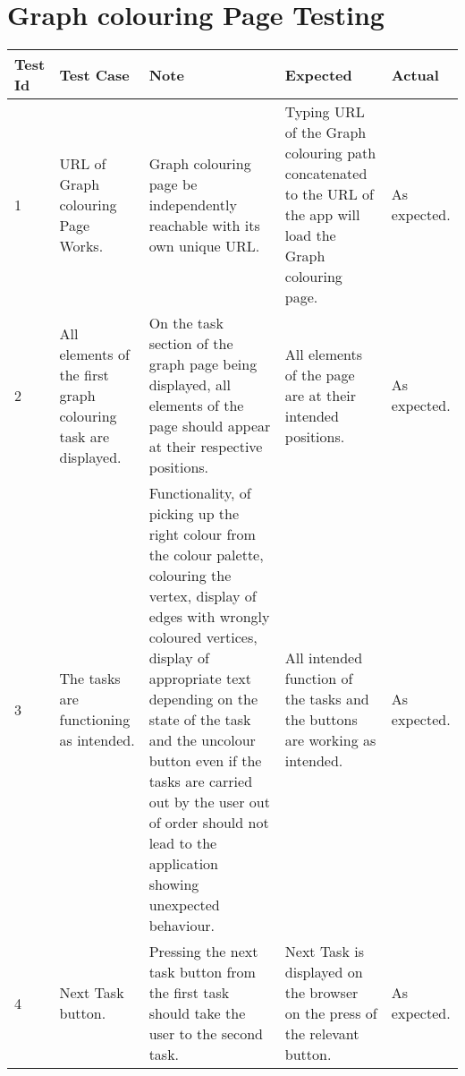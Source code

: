 \section{Graph colouring Page Testing}
\begin{tabular}{ |p{1cm}|p{2cm}|p{4cm}|p{2cm}|p{2cm}| }
 \hline
 \textbf{Test Id} & \textbf{Test Case} & \textbf{Note} & \textbf{Expected} & \textbf{Actual} \\
 \hline
 1 
 & URL of Graph colouring Page Works. 
 & Graph colouring page be independently reachable with its own unique
   URL.
 & Typing URL of the Graph colouring path concatenated to the URL of the app will load the
   Graph colouring page.
 & As expected. \\
 \hline
 2 
 & All elements of the first graph colouring task are displayed.
 & On the task section of the graph page being displayed, all elements of
   the page should appear at their respective positions.
 & All elements of the page are at their intended positions.
 & As expected. \\
 \hline
 3 
 & The tasks are functioning as intended. 
 & Functionality, of picking up the right colour from the colour palette,
   colouring the vertex, display of edges with wrongly coloured vertices, display of
   appropriate text depending on the state of the task and the uncolour button
   even if the tasks are carried out by the user out of order should not lead to
   the application showing unexpected behaviour.
 & All intended function of the tasks and the buttons are working as intended. 
 & As expected. \\
 \hline
 4 
 & Next Task button.
 & Pressing the next task button from the first task
   should take the user to the second task.
 & Next Task is displayed on the browser on the press of the relevant button.
 & As expected. \\
 \hline
\end{tabular}

